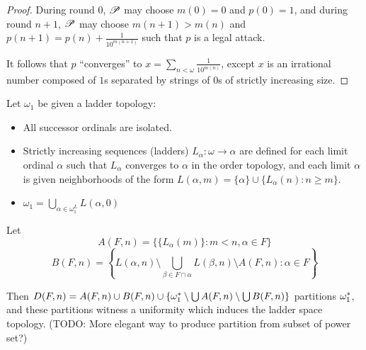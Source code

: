 \begin{proof}
  During round $0$, $\mathscr{P}$ may choose $m(0)=0$ and $p(0)=1$, 
  and during round $n+1$,
  $\mathscr{P}$ may choose $m(n+1)>m(n)$ and
  $p(n+1)=p(n)+\frac{1}{10^{m(n+1)}}$ such that $p$ is a legal attack.
  
  It follows that $p$ ``converges'' to 
  $x=\sum_{n<\omega}\frac{1}{10^{m(n)}}$, except $x$ is an irrational
  number composed of $1$s separated by strings of $0$s of strictly
  increasing size.
\end{proof}

\begin{example}
  Let $\omega_1$ be given a ladder topology:
    \begin{itemize}
      \item All successor ordinals are isolated.
      \item Strictly increasing sequences (ladders) $L_\alpha:\omega\to\alpha$ 
            are defined for each limit ordinal $\alpha$ such that $L_\alpha$ converges to $\alpha$ in the order topology, and each limit
            $\alpha$ is given neighborhoods of the form
            $L(\alpha,m)=\{\alpha\}\cup\{L_\alpha(n):n\geq m\}$. 
      \item $\omega_1=\bigcup_{\alpha\in\omega_1^L} L(\alpha,0)$
    \end{itemize} 
  
  Let 
    \[
      A(F,n)
        =
      \{\{L_{\alpha}(m)\} : m<n, \alpha\in F\}
    \]
    \[
      B(F,n)
        =
      \left\{
        L(\alpha,n)
          \setminus 
        \bigcup_{\beta\in F\cap\alpha}L(\beta,n)
          \setminus
        A(F,n)
          :
        \alpha\in F
      \right\}
    \]
    
  Then 
  $
    D(F,n)
      =
    A(F,n)
      \cup 
    B(F,n)
      \cup 
    \{
      \omega^*_1
        \setminus
      \bigcup A(F,n)
        \setminus
      \bigcup B(F,n)
    \}
  $
  partitions $\omega^*_1$, and these partitions witness a uniformity
  which induces the ladder space topology. (TODO: More elegant way to 
  produce partition from subset of power set?)
\end{example}

